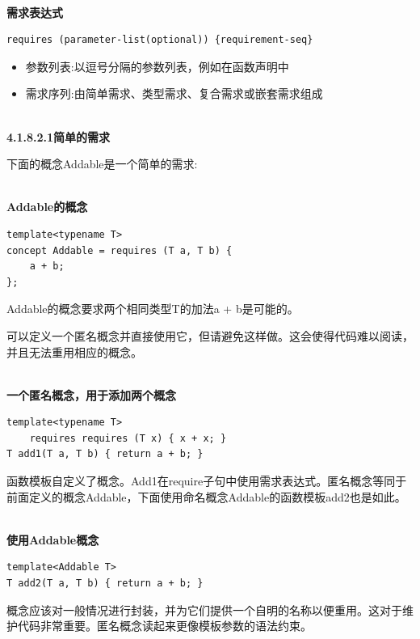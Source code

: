 \hspace*{\fill} \\ %
\noindent
\textbf{需求表达式}
\begin{lstlisting}[style=styleCXX]
requires (parameter-list(optional)) {requirement-seq}
\end{lstlisting}

\begin{itemize}
\item 
参数列表:以逗号分隔的参数列表，例如在函数声明中

\item 
需求序列:由简单需求、类型需求、复合需求或嵌套需求组成
\end{itemize}

\hspace*{\fill} \\ %
\noindent
\textbf{4.1.8.2.1\hspace{0.2cm}简单的需求}

下面的概念Addable是一个简单的需求:

\hspace*{\fill} \\ %
\noindent
\textbf{Addable的概念}
\begin{lstlisting}[style=styleCXX]
template<typename T>
concept Addable = requires (T a, T b) {
	a + b;
};
\end{lstlisting}

Addable的概念要求两个相同类型T的加法a + b是可能的。

\begin{tcolorbox}[breakable,enhanced jigsaw,colback=blue!5!white,colframe=blue!75!black,title={避免匿名概念}]
	
可以定义一个匿名概念并直接使用它，但请避免这样做。这会使得代码难以阅读，并且无法重用相应的概念。

\hspace*{\fill} \\ %
\noindent
\textbf{一个匿名概念，用于添加两个概念}
\begin{lstlisting}[style=styleCXX]
template<typename T>
	requires requires (T x) { x + x; }
T add1(T a, T b) { return a + b; }
\end{lstlisting}

函数模板自定义了概念。Add1在require子句中使用需求表达式。匿名概念等同于前面定义的概念Addable，下面使用命名概念Addable的函数模板add2也是如此。

\hspace*{\fill} \\ %
\noindent
\textbf{使用Addable概念}
\begin{lstlisting}[style=styleCXX]
template<Addable T>
T add2(T a, T b) { return a + b; }
\end{lstlisting}

概念应该对一般情况进行封装，并为它们提供一个自明的名称以便重用。这对于维护代码非常重要。匿名概念读起来更像模板参数的语法约束。
	
\end{tcolorbox}

